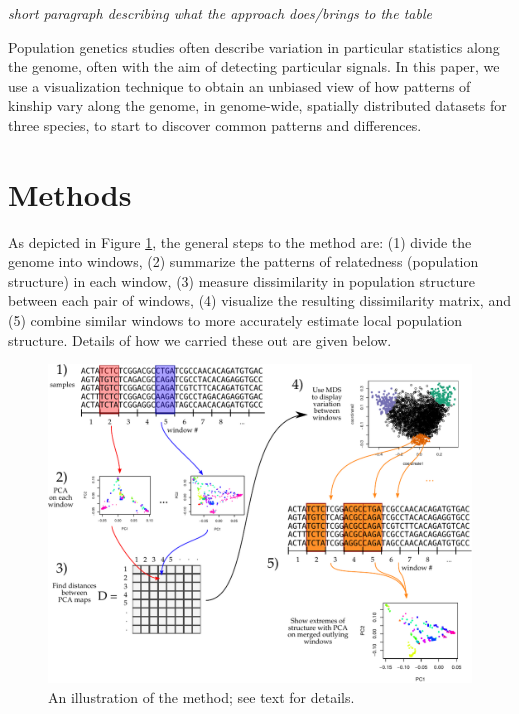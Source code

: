 \documentclass[11pt, oneside]{article}   	%
\newcommand{\plr}[1]{{\em \color{blue} #1}}
\begin{document}
\plr{short paragraph describing what the approach does/brings to the table}

Population genetics studies often describe variation in particular statistics along the genome,
often with the aim of detecting particular signals.
In this paper, we use a visualization technique to obtain an unbiased view
of how patterns of kinship vary along the genome,
in genome-wide, spatially distributed datasets for three species,
to start to discover common patterns and differences.



\section{Methods}


As depicted in Figure \ref{fig:diagram}, the general steps to the method are:
(1) divide the genome into windows,
(2) summarize the patterns of relatedness (population structure) in each window,
(3) measure dissimilarity in population structure between each pair of windows,
(4) visualize the resulting dissimilarity matrix,
and (5) combine similar windows to more accurately estimate local population structure.
Details of how we carried these out are given below.

\begin{figure}
    \begin{center}
       \includegraphics{the-method-diagram}
    \end{center}
    \caption{
         An illustration of the method; see text for details.
         \label{fig:diagram}
    }
\end{figure}
\end{document}
